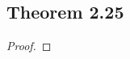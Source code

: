 \documentclass[../../main.tex]{subfiles}
\begin{document}
\subsection{Theorem 2.25}
\begin{wts}

\end{wts}
\begin{proof}

\end{proof}
\end{document}

